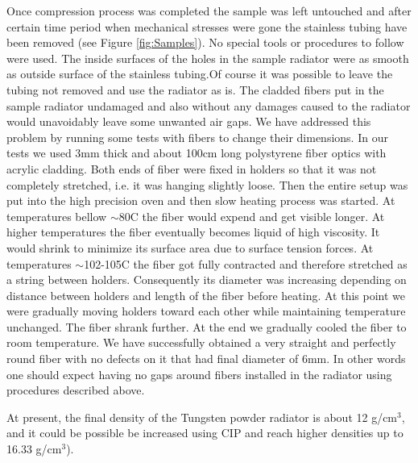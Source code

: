 Once compression process was completed the sample was left untouched and after certain time period when mechanical stresses were gone the stainless tubing have been removed (see Figure \ref{fig:Samples}). No special tools or procedures to follow were used. The inside surfaces of the holes in the sample radiator were as smooth as outside surface of the stainless tubing.Of course it was possible to leave the tubing not removed and use the radiator as is.
The cladded fibers put in the sample radiator undamaged and also without any damages caused to the radiator would unavoidably leave some unwanted air gaps. We have addressed this problem by running some tests with fibers to change their dimensions. 
In our tests we used 3mm thick and about 100cm long polystyrene fiber optics with acrylic cladding. Both ends of fiber were fixed in holders so that it was not completely stretched, i.e. it was hanging slightly loose. Then the entire setup was put into the high precision oven and then slow heating process was started. At temperatures bellow  $\sim$80\degree C the fiber would expend and get visible longer. At higher temperatures the fiber eventually becomes liquid of high viscosity. It would shrink to minimize its surface area due to surface tension forces. At temperatures $\sim$102-105\degree C the fiber got fully contracted and therefore stretched as a string between holders. Consequently its diameter was increasing depending on distance between holders and length of the fiber before heating. At this point we were gradually moving holders toward each other while maintaining temperature unchanged. The fiber shrank further. At the end we gradually cooled the fiber to room temperature. We have successfully obtained a very straight and perfectly round fiber with no defects on it that  had final diameter of 6mm. In other words one should expect having no gaps around fibers installed in the radiator using procedures described above.

At present, the final density of the Tungsten powder radiator is about 12 g/cm$^3$, and it could be possible be increased using CIP and reach higher densities up to 16.33 g/cm$^3$).    
